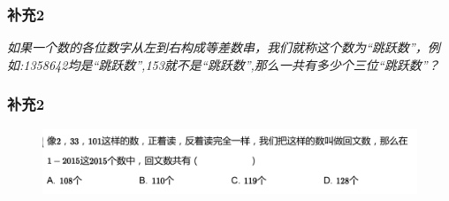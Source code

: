 \begin{frame}
    \frametitle{补充2}
    \textit{如果一个数的各位数字从左到右构成等差数串，我们就称这个数为“跳跃数”，例如:1358642均是“跳跃数”,153就不是“跳跃数”,那么一共有多少个三位“跳跃数”？}
\end{frame}

\begin{frame}
    \frametitle{补充2}
    \begin{figure}[H] 
        \centering
        \includegraphics[width=1\textwidth]{./pics/Chapter_2/buchong2_3.png}
    \end{figure}
\end{frame}